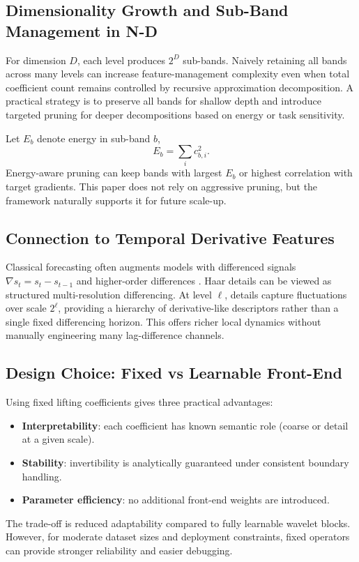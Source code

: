 \documentclass[journal]{IEEEtran}
\begin{document}
\subsection{Dimensionality Growth and Sub-Band Management in N-D}
For dimension $D$, each level produces $2^D$ sub-bands. Naively retaining all bands across many levels can increase feature-management complexity even when total coefficient count remains controlled by recursive approximation decomposition. A practical strategy is to preserve all bands for shallow depth and introduce targeted pruning for deeper decompositions based on energy or task sensitivity.

Let $E_b$ denote energy in sub-band $b$,
\begin{equation}
E_b=\sum_{i} c_{b,i}^2.
\end{equation}
Energy-aware pruning can keep bands with largest $E_b$ or highest correlation with target gradients. This paper does not rely on aggressive pruning, but the framework naturally supports it for future scale-up.

\subsection{Connection to Temporal Derivative Features}
Classical forecasting often augments models with differenced signals $\nabla s_t=s_t-s_{t-1}$ and higher-order differences \cite{box2015time,hyndman2018forecasting}. Haar details can be viewed as structured multi-resolution differencing. At level $\ell$, details capture fluctuations over scale $2^{\ell}$, providing a hierarchy of derivative-like descriptors rather than a single fixed differencing horizon. This offers richer local dynamics without manually engineering many lag-difference channels.

\subsection{Design Choice: Fixed vs Learnable Front-End}
Using fixed lifting coefficients gives three practical advantages:
\begin{itemize}
  \item \textbf{Interpretability}: each coefficient has known semantic role (coarse or detail at a given scale).
  \item \textbf{Stability}: invertibility is analytically guaranteed under consistent boundary handling.
  \item \textbf{Parameter efficiency}: no additional front-end weights are introduced.
\end{itemize}
The trade-off is reduced adaptability compared to fully learnable wavelet blocks. However, for moderate dataset sizes and deployment constraints, fixed operators can provide stronger reliability and easier debugging.
\end{document}
